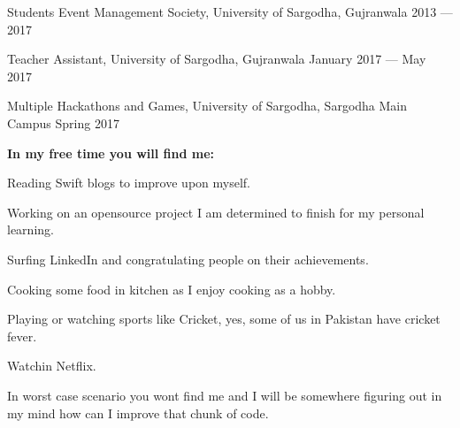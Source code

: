 

Students Event Management Society, University of Sargodha, Gujranwala	\hfill 2013 --- 2017
 
Teacher Assistant, University of Sargodha, Gujranwala	\hfill January 2017 --- May 2017

Multiple Hackathons and Games, University of Sargodha, Sargodha Main Campus	\hfill Spring 2017

\bigbreak

\textbf{In my free time you will find me:}
\begin{zitemize}
\item Reading Swift blogs to improve upon myself.
\item Working on an opensource project I am determined to finish for my personal learning.
\item Surfing LinkedIn and congratulating people on their achievements.
\item Cooking some food in kitchen as I enjoy cooking as a hobby.
\item Playing or watching sports like Cricket, yes, some of us in Pakistan have cricket fever.
\item Watchin Netflix.
\item In worst case scenario you wont find me and I will be somewhere figuring out in my mind how can I improve that chunk of code. 
\end{zitemize}